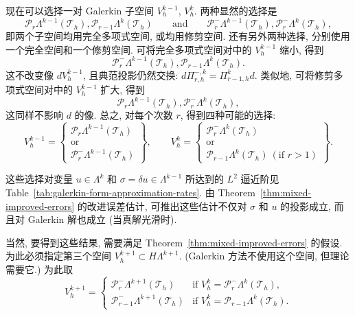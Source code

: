 现在可以选择一对 Galerkin 子空间 $V_h^{k-1}$, $V_h^k$. 两种显然的选择是
\[
\mathcal P_r\Lambda^{k-1}(\mathcal T_h),\mathcal P_{r-1}\Lambda^k(\mathcal T_h)\qquad\text{and}\qquad\mathcal P_r^-\Lambda^{k-1}(\mathcal T_h),\mathcal P_r^-\Lambda^k(\mathcal T_h),
\]
即两个子空间均用完全多项式空间, 或均用修剪空间. 还有另外两种选择, 分别使用一个完全空间和一个修剪空间. 可将完全多项式空间对中的 $V_h^{k-1}$ 缩小, 得到
\[
\mathcal P_r^-\Lambda^{k-1}(\mathcal T_h),\mathcal P_{r-1}\Lambda^k(\mathcal T_h).
\]
这不改变像 $dV_h^{k-1}$, 且典范投影仍然交换: $d\Pi_{r,h}^{-,k}=\Pi_{r-1,h}^kd$. 类似地, 可将修剪多项式空间对中的 $V_h^{k-1}$ 扩大, 得到
\[
\mathcal P_r\Lambda^{k-1}(\mathcal T_h),\mathcal P_r^-\Lambda^k(\mathcal T_h),
\]
这同样不影响 $d$ 的像. 总之, 对每个次数 $r$, 得到四种可能的选择:
\begin{equation}\label{eq:four-galerkin-form-pairs}
V_h^{k-1}=\left\{\begin{gathered}\mathcal P_r\Lambda^{k-1}(\mathcal T_h)\\\text{or}\\\mathcal P_r^-\Lambda^{k-1}(\mathcal T_h)\end{gathered}\right\},\qquad
V_h^k=\left\{\begin{gathered}\mathcal P_r^-\Lambda^k(\mathcal T_h)\\\text{or}\\\mathcal P_{r-1}\Lambda^k(\mathcal T_h)\ (\text{if }r>1)\end{gathered}\right\}.
\end{equation}

这些选择对变量 $u\in\Lambda^k$ 和 $\sigma=\delta u\in\Lambda^{k-1}$ 所达到的 $L^2$ 逼近阶见 Table~\ref{tab:galerkin-form-approximation-rates}. 由 Theorem~\ref{thm:mixed-improved-errors} 的改进误差估计, 可推出这些估计不仅对 $\sigma$ 和 $u$ 的投影成立, 而且对 Galerkin 解也成立 (当真解光滑时).

当然, 要得到这些结果, 需要满足 Theorem~\ref{thm:mixed-improved-errors} 的假设. 为此必须指定第三个空间 $V_h^{k+1}\subset H\Lambda^{k+1}$. (Galerkin 方法不使用这个空间, 但理论需要它.) 为此取
\[
V_h^{k+1}=\begin{cases}\mathcal P_r^-\Lambda^{k+1}(\mathcal T_h)&\text{if }V_h^k=\mathcal P_r^-\Lambda^k(\mathcal T_h),\\\mathcal P_{r-1}^-\Lambda^{k+1}(\mathcal T_h)&\text{if }V_h^k=\mathcal P_{r-1}\Lambda^k(\mathcal T_h).
\end{cases}
\]

